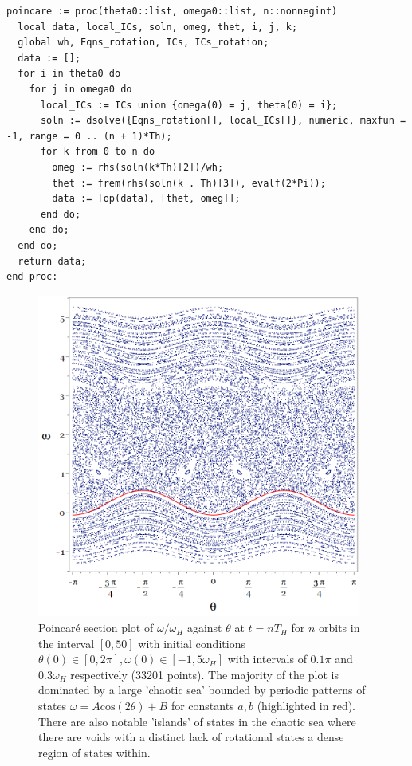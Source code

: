 \documentclass[10pt, twocolumn]{article} %
\begin{document}
\begin{lstlisting}
poincare := proc(theta0::list, omega0::list, n::nonnegint)
  local data, local_ICs, soln, omeg, thet, i, j, k;
  global wh, Eqns_rotation, ICs, ICs_rotation;
  data := [];
  for i in theta0 do 
    for j in omega0 do 
      local_ICs := ICs union {omega(0) = j, theta(0) = i};
      soln := dsolve({Eqns_rotation[], local_ICs[]}, numeric, maxfun = -1, range = 0 .. (n + 1)*Th);
      for k from 0 to n do 
        omeg := rhs(soln(k*Th)[2])/wh;
        thet := frem(rhs(soln(k . Th)[3]), evalf(2*Pi));
        data := [op(data), [thet, omeg]];
      end do;
    end do;
  end do;
  return data;
end proc:
\end{lstlisting}

\clearpage

\begin{figure}[t]
\centering
\includegraphics[width=0.95\textwidth]{poincare_section_large.png}
  \caption{Poincar\'e section plot of $\omega / \omega_H$ against $\theta$ at $t = nT_H$ for $n$ orbits in the interval $[0,50]$ with initial conditions $\theta(0) \in [0, 2 \pi], \omega(0) \in [-1, 5 \omega_H]$ with intervals of $0.1 \pi$ and $0.3 \omega_H$ respectively (33201 points). The majority of the plot is dominated by a large 'chaotic sea' bounded by periodic patterns of states $\omega = A \mathrm{cos}(2\theta)+B$ for constants $a,b$ (highlighted in red). There are also notable 'islands' of states in the chaotic sea where there are voids with a distinct lack of rotational states a dense region of states within.}
\label{poincare_section_large}
\end{figure}
\end{document}
